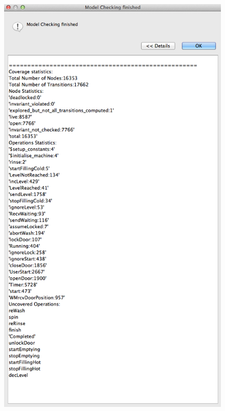  \begin{figure}[!htbp]
  \centering
  \ifplastex
  \includegraphics[width=1024]{figures/image48.png}
  \else

\end{figure}
